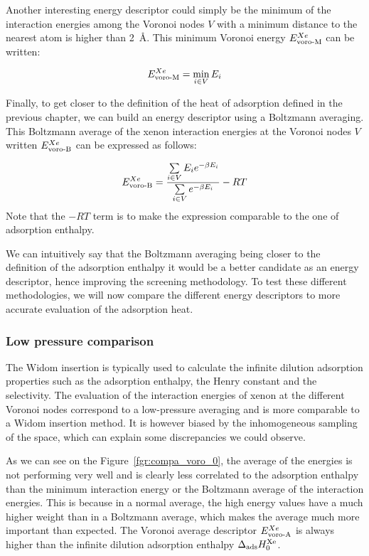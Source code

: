 \documentclass[main]{subfiles}
\begin{document}
Another interesting energy descriptor could simply be the minimum of the interaction energies among the Voronoi nodes $V$ with a minimum distance to the nearest atom is higher than \SI{2}{\angstrom}. This minimum Voronoi energy $E_{\text{voro-M}}^{Xe}$ can be written: 

\begin{equation}
    E_{\text{voro-M}}^{Xe} = \min_{i \in V} E_i
\end{equation}

Finally, to get closer to the definition of the heat of adsorption defined in the previous chapter, we can build an energy descriptor using a Boltzmann averaging. This Boltzmann average of the xenon interaction energies at the Voronoi nodes $V$ written $E_{\text{voro-B}}^{Xe}$ can be expressed as follows:

\begin{equation}
    E_{\text{voro-B}}^{Xe} = \dfrac{\sum\limits_{i \in V} E_i e^{-\beta E_i}}{\sum\limits_{i \in V} e^{-\beta E_i}} -RT
\end{equation}
Note that the $-RT$ term is to make the expression comparable to the one of adsorption enthalpy. 

We can intuitively say that the Boltzmann averaging being closer to the definition of the adsorption enthalpy it would be a better candidate as an energy descriptor, hence improving the screening methodology. To test these different methodologies, we will now compare the different energy descriptors to more accurate evaluation of the adsorption heat. 

\subsubsection{Low pressure comparison}

The Widom insertion is typically used to calculate the infinite dilution adsorption properties such as the adsorption enthalpy, the Henry constant and the selectivity. The evaluation of the interaction energies of xenon at the different Voronoi nodes correspond to a low-pressure averaging and is more comparable to a Widom insertion method. It is however biased by the inhomogeneous sampling of the space, which can explain some discrepancies we could observe.

As we can see on the Figure~\ref{fgr:compa_voro_0}, the average of the energies is not performing very well and is clearly less correlated to the adsorption enthalpy than the minimum interaction energy or the Boltzmann average of the interaction energies. This is because in a normal average, the high energy values have a much higher weight than in a Boltzmann average, which makes the average much more important than expected. The Voronoi average descriptor $E_{\text{voro-A}}^{Xe}$ is always higher than the infinite dilution adsorption enthalpy $\Delta_{\text{ads}} H_{0}^{\text{Xe}}$. 
\end{document}
